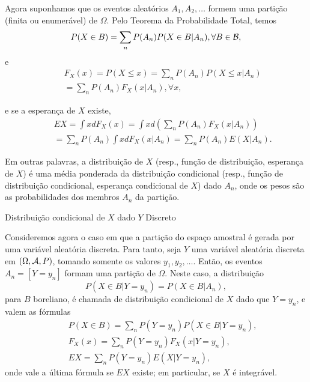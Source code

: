 \begin{frame}

\begin{block}{}


Agora suponhamos que os eventos aleatórios $A_1,A_2,\ldots$ formem
uma partição (finita ou enumerável) de $\Omega$. Pelo Teorema da
Probabilidade Total, temos
$$P(X\in B)=\sum_n P(A_n)P(X\in B|A_n),\forall B\in {\cal B},$$
e
\begin{eqnarray}
& & F_X(x)=P(X\leq x)=\sum_n P(A_n)P(X\leq x|A_n) \nonumber \\
& & =\sum_n P(A_n)F_X(x|A_n), \forall x \nonumber,
\end{eqnarray}

e se a esperança de $X$ existe,
\begin{eqnarray}
& & EX=\int xdF_X(x)=\int x d(\sum_n P(A_n)F_X(x|A_n)) \nonumber \\
& & =\sum_n P(A_n)\int x dF_X(x|A_n)=\sum_n P(A_n)E(X|A_n)\nonumber.
\end{eqnarray}

\end{block}
Em outras palavras, a distribuição de $X$ (resp., função de
distribuição, esperança de $X$) é uma média ponderada da
distribuição condicional (resp., função de distribuição condicional,
esperança condicional de $X$) dado $A_n$, onde os pesos são as
probabilidades dos membros $A_n$ da partição.
\end{frame}


\begin{frame}

\begin{block}{Distribuição condicional de $X$ dado $Y$ Discreto}


Consideremos agora o caso em que a partição do espaço amostral é
gerada por uma variável aleatória discreta. Para tanto, seja $Y$ uma
variável aleatória discreta em $(\Omega,{\cal A}, P)$, tomando somente os
valores $y_1,y_2,\ldots$. Então, os eventos $A_n=[Y=y_n]$ formam uma
partição de $\Omega$. Neste caso, a distribuição
$$P(X\in B|Y=y_n)=P(X\in B|A_n),$$
para $B$ boreliano, é chamada de distribuição condicional de $X$
dado que $Y=y_n$, e valem as fórmulas
\begin{eqnarray}
& & P(X\in B)=\sum_n P(Y=y_n)P(X\in B|Y=y_n),
\nonumber \\
& & F_X(x)=\sum_n P(Y=y_n)F_X(x|Y=y_n), \nonumber \\
& & EX=\sum_n P(Y=y_n)E(X|Y=y_n), \nonumber
\end{eqnarray}
onde vale a última fórmula se $EX$ existe; em particular, se $X$ é
integrável.

\end{block}
\end{frame}


